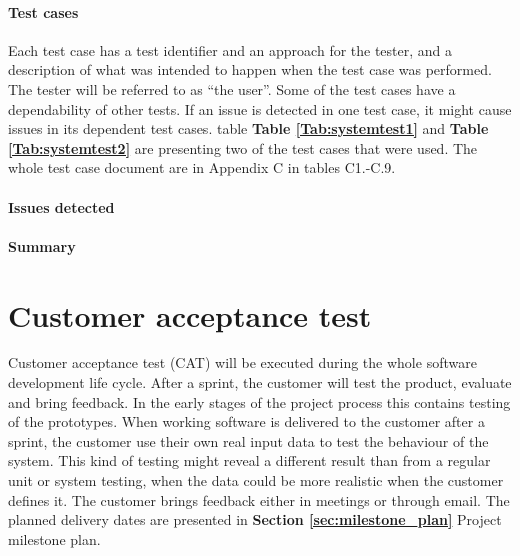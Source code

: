 {\paragraph{Test cases}
Each test case has a test identifier and an approach for the tester, and a description of what was intended to happen when the test case was performed. The tester will be referred to as “the user”. 
Some of the test cases have a dependability of other tests. If an issue is detected in one test case, it might cause issues in its dependent test cases. table \textbf{Table \ref{Tab:systemtest1}} and \textbf{Table \ref{Tab:systemtest2}} are presenting two of the test cases that were used. The whole test case document are in Appendix C in tables C1.-C.9. 

\paragraph{Issues detected}

\paragraph{Summary}

\section{Customer acceptance test}
\label{sec:acceptance_test}

Customer acceptance test (CAT) will be executed during the whole software development life cycle. After a sprint, the customer will test the product, evaluate and bring feedback. In the early stages of the project process this contains testing of the prototypes. When working software is delivered to the customer after a sprint, the customer use their own real input data to test the behaviour of the system. This kind of testing might reveal a different result than from a regular unit or system testing, when the data could be more realistic when the customer defines it. The customer brings feedback either in meetings or through email. The planned delivery dates are presented in \textbf{Section \ref{sec:milestone_plan}} Project milestone plan.  

\renewcommand{\arraystretch}{2}%
\begin{center}
	\begin{longtable}{ | p{4cm} | p{13cm} | }
		

\end{longtable}
\end{center}}
